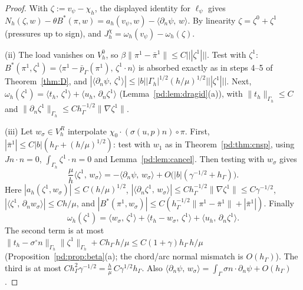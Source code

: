 \documentclass[11pt,reqno]{amsart}
\theoremstyle{plain}
\theoremstyle{definition}
\newcommand{\hG}{h_\Gamma}
\newcommand{\Gh}{\Gamma_h}
\newcommand{\VR}{V_h^R}
\newcommand{\VO}{V_h^0}
\newcommand{\dn}{\partial_n}
\newcommand{\pbG}{\bar p_{\Gamma}}
\newcommand{\ip}[2]{\langle #1,\, #2\rangle}
\newcommand{\tnorm}[1]{|\!|\!|#1|\!|\!|}
\newcommand{\norm}[1]{\lVert #1\rVert}
\begin{document}
\begin{proof}
With $\zeta:=v_\psi-\chi_h$, the displayed identity for $\ell_\psi$ gives $N_h(\zeta,w)-\theta B^\ast(\pi,w)=a_h(v_\psi,w)-\ip{\dn\psi}{w}$. By linearity $\zeta=\zeta^0+\zeta^1$ (pressures up to sign), and $J^\chi_h=\omega_h(v_\psi)-\omega_h(\zeta)$.

(ii) The load vanishes on $\VO$, so $\beta\norm{\pi^1-\bar\pi^1}\le C\tnorm{\zeta^1}$. Test with $\zeta^1$: $B^\ast(\pi^1,\zeta^1)=\ip{\pi^1-\pbG(\pi^1)}{\zeta^1\cdot n}$ is absorbed exactly as in steps 4--5 of Theorem~\ref{thm:D}, and $|\ip{\dn\psi}{\zeta^1}|\le|b||\Gh|^{1/2}(h/\mu)^{1/2}\tnorm{\zeta^1}$. Next, $\omega_h(\zeta^1)=\ip{t_h}{\zeta^1}+\ip{u_h}{\dn\zeta^1}$ (Lemma~\ref{pd:lem:dragid}(a)), with $\norm{t_h}_{\Gh}\le C$ and $\norm{\dn\zeta^1}_{\Gh}\le C\hG^{-1/2}\norm{\nabla\zeta^1}$.

(iii) Let $w_\sigma\in\VR$ interpolate $\chi_0\cdot(\sigma(u,p)n)\circ\pi$. First, $|\bar\pi^1|\le C|b|(\hG+(h/\mu)^{1/2})$: test with $w_1$ as in Theorem~\ref{pd:thm:cnsp}, using $Jn\cdot n=0$, $\int_{\Gh}\zeta^1\cdot n=0$ and Lemma~\ref{pd:lem:cancel}. Then testing with $w_\sigma$ gives
\[
\frac\mu h\ip{\zeta^1}{w_\sigma}=-\ip{\dn\psi}{w_\sigma}+O\bigl(|b|(\gamma^{-1/2}+\hG)\bigr).
\]
Here $|a_h(\zeta^1,w_\sigma)|\le C(h/\mu)^{1/2}$, $|\ip{\dn\zeta^1}{w_\sigma}|\le C\hG^{-1/2}\norm{\nabla\zeta^1}\le C\gamma^{-1/2}$, $|\ip{\zeta^1}{\dn w_\sigma}|\le Ch/\mu$, and $|B^\ast(\pi^1,w_\sigma)|\le C(\hG^{-1/2}\norm{\pi^1-\bar\pi^1}+|\bar\pi^1|)$. Finally
\[
\omega_h(\zeta^1)=\ip{w_\sigma}{\zeta^1}+\ip{t_h-w_\sigma}{\zeta^1}+\ip{u_h}{\dn\zeta^1}.
\]
The second term is at most $\norm{t_h-\sigma^\circ n}_{\Gh}\norm{\zeta^1}_{\Gh}+C\hG\,h/\mu\le C(1+\gamma)\hG\,h/\mu$ (Proposition~\ref{pd:prop:beta}(a); the chord/arc normal mismatch is $O(\hG)$). The third is at most $C\hG^2\gamma^{-1/2}=\frac h\mu\,C\gamma^{1/2}\hG$. Also $\ip{\dn\psi}{w_\sigma}=\int_\Gamma\sigma n\cdot\dn\psi+O(\hG)$.
\end{proof}
\end{document}
